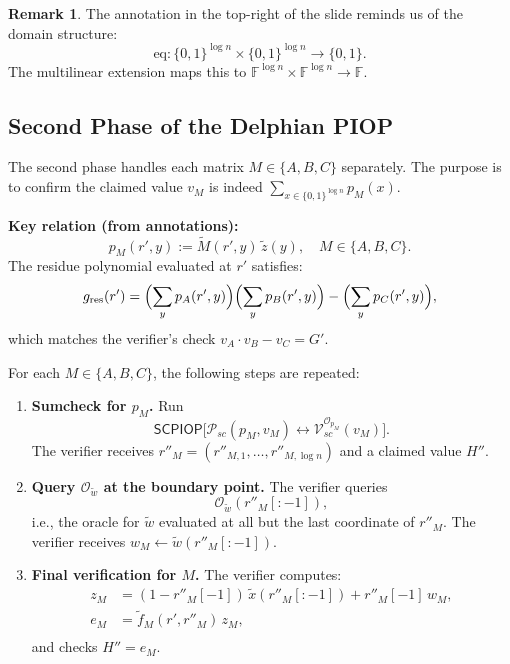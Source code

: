 \documentclass[11pt]{article}
\theoremstyle{plain}
\theoremstyle{definition}
\newtheorem{remark}[theorem]{Remark}
\newcommand{\F}{\mathbb{F}}
\newcommand{\tildew}{\tilde{w}}
\newcommand{\tildez}{\tilde{z}}
\newcommand{\tildex}{\tilde{x}}
\newcommand{\tildeM}{\widetilde{M}}
\begin{document}
\begin{remark}
  The annotation in the top-right of the slide reminds us of the domain structure:
  \[
    \mathrm{eq} : \{0,1\}^{\log n} \times \{0,1\}^{\log n} \to \{0,1\}.
  \]
  The multilinear extension maps this to $\F^{\log n} \times \F^{\log n} \to \F$.
\end{remark}

\subsection{Second Phase of the Delphian PIOP}

The second phase handles each matrix $M \in \{A, B, C\}$ separately.  The purpose is to
confirm the claimed value $v_M$ is indeed $\sum_{x \in \{0,1\}^{\log n}} p_M(x)$.

\medskip
\noindent\textbf{Key relation (from annotations):}
\[
  p_M(r', y) := \tildeM(r', y)\,\tildez(y), \quad M \in \{A, B, C\}.
\]
The residue polynomial evaluated at $r'$ satisfies:
\[
  g_{\mathrm{res}}(r')
  = \Bigl(\sum_y p_A(r',y)\Bigr)\Bigl(\sum_y p_B(r',y)\Bigr)
    - \Bigl(\sum_y p_C(r',y)\Bigr),
\]
which matches the verifier's check $v_A \cdot v_B - v_C = G'$.

\bigskip
\noindent For each $M \in \{A, B, C\}$, the following steps are repeated:

\begin{enumerate}
  \item \textbf{Sumcheck for $p_M$.}  Run
    \[
      \mathsf{SCPIOP}\bigl[\mathcal{P}_{sc}(p_M, v_M)
      \leftrightarrow \mathcal{V}_{sc}^{\mathcal{O}_{p_M}}(v_M)\bigr].
    \]
    The verifier receives
    $r''_M = (r''_{M,1}, \ldots, r''_{M,\log n})$ and a claimed value $H''$.

  \item \textbf{Query $\mathcal{O}_{\tildew}$ at the boundary point.}  The verifier queries
    \[
      \mathcal{O}_{\tildew}(r''_M[:-1]),
    \]
    i.e., the oracle for $\tildew$ evaluated at all but the last coordinate of $r''_M$.
    The verifier receives $w_M \leftarrow \tildew(r''_M[:-1])$.

  \item \textbf{Final verification for $M$.}  The verifier computes:
    \begin{align*}
      z_M   &= (1 - r''_M[-1])\,\tildex(r''_M[:-1]) + r''_M[-1]\, w_M, \\
      e_M   &= \tilde{f}_M(r', r''_M)\, z_M, \\
    \end{align*}
    and checks $H'' = e_M$.
\end{enumerate}
\end{document}
